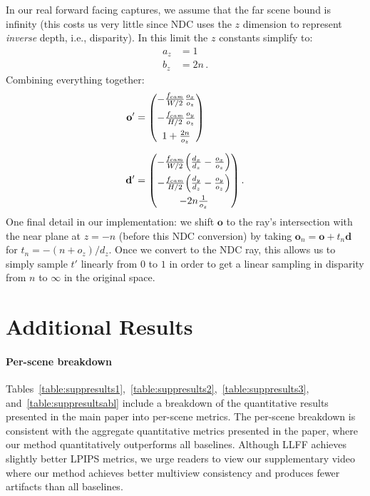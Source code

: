 \documentclass[runningheads]{llncs}
\let\originalleft\left
\let\originalright\right
\renewcommand{\left}{\mathopen{}\mathclose\bgroup\originalleft}
\renewcommand{\right}{\aftergroup\egroup\originalright}
\begin{document}
In our real forward facing captures, we assume that the far scene bound is infinity (this costs us very little since NDC uses the $z$ dimension to represent \emph{inverse} depth, i.e., disparity). In this limit the $z$ constants simplify to:
\begin{align}
    a_z &= 1 \\
    b_z &= 2n \, .
\end{align}
Combining everything together:
\begin{align}
    \mathbf o' &= 
    \begin{pmatrix}
        -\frac{f_{cam}}{W/2} \frac{o_x}{o_z} \\[6pt]
        -\frac{f_{cam}}{H/2} \frac{o_y}{o_z} \\[6pt]
        1 + \frac{2n}{o_z}
    \end{pmatrix}
    \\[6pt]
    \mathbf d' &= 
    \begin{pmatrix}
        -\frac{f_{cam}}{W/2} \left(\frac{d_x}{d_z} - \frac{o_x}{o_z}\right) \\[6pt]
        -\frac{f_{cam}}{H/2} \left(\frac{d_y}{d_z} - \frac{o_y}{o_z}\right) \\[6pt]
        -2n \frac{1}{o_z}
    \end{pmatrix} \, .
\end{align}
One final detail in our implementation: we shift $\mathbf o$ to the ray's intersection with the near plane at $z=-n$ (before this NDC conversion) by taking $\mathbf o_n = \mathbf o + t_n \mathbf d$ for $t_n = -(n + o_z) / d_z$. Once we convert to the NDC ray, this allows us to simply sample $t'$ linearly from $0$ to $1$ in order to get a linear sampling in disparity from $n$ to $\infty$ in the original space.
 
\section{Additional Results}

\paragraph{\textbf{Per-scene breakdown}}
Tables~\ref{table:suppresults1},~\ref{table:suppresults2},~\ref{table:suppresults3}, and~\ref{table:suppresultsabl} include a breakdown of the quantitative results presented in the main paper into per-scene metrics. The per-scene breakdown is consistent with the aggregate quantitative metrics presented in the paper, where our method quantitatively outperforms all baselines. Although LLFF achieves slightly better LPIPS metrics, we urge readers to view our supplementary video where our method achieves better multiview consistency and produces fewer artifacts than all baselines. 
\end{document}
